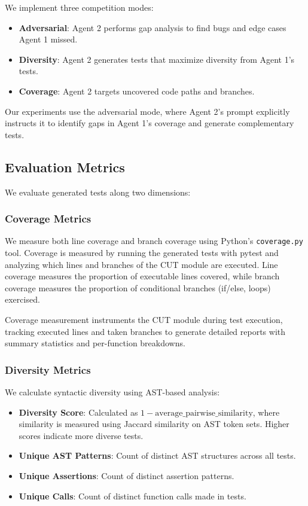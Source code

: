 \documentclass[11pt]{article}
\begin{document}
We implement three competition modes:

\begin{itemize}
\item \textbf{Adversarial}: Agent 2 performs gap analysis to find bugs and edge cases Agent 1 missed.
\item \textbf{Diversity}: Agent 2 generates tests that maximize diversity from Agent 1's tests.
\item \textbf{Coverage}: Agent 2 targets uncovered code paths and branches.
\end{itemize}

Our experiments use the adversarial mode, where Agent 2's prompt explicitly instructs it to identify gaps in Agent 1's coverage and generate complementary tests.

\subsection{Evaluation Metrics}

We evaluate generated tests along two dimensions:

\subsubsection{Coverage Metrics}

We measure both line coverage and branch coverage using Python's \texttt{coverage.py} tool. Coverage is measured by running the generated tests with pytest and analyzing which lines and branches of the CUT module are executed. Line coverage measures the proportion of executable lines covered, while branch coverage measures the proportion of conditional branches (if/else, loops) exercised.

Coverage measurement instruments the CUT module during test execution, tracking executed lines and taken branches to generate detailed reports with summary statistics and per-function breakdowns.

\subsubsection{Diversity Metrics}

We calculate syntactic diversity using AST-based analysis:

\begin{itemize}
\item \textbf{Diversity Score}: Calculated as $1 - \text{average\_pairwise\_similarity}$, where similarity is measured using Jaccard similarity on AST token sets. Higher scores indicate more diverse tests.
\item \textbf{Unique AST Patterns}: Count of distinct AST structures across all tests.
\item \textbf{Unique Assertions}: Count of distinct assertion patterns.
\item \textbf{Unique Calls}: Count of distinct function calls made in tests.
\end{itemize}
\end{document}

